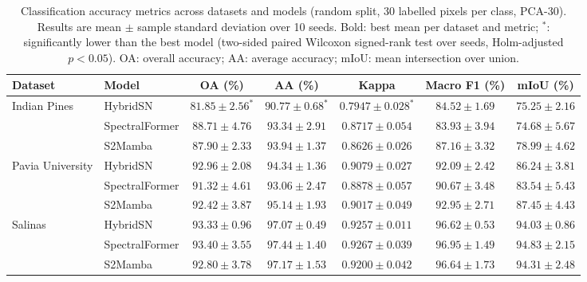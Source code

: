 \begin{table}[!t]
\centering
\caption{Classification accuracy metrics across datasets and models (random split, 30 labelled pixels per class, PCA-30). Results are mean $\pm$ sample standard deviation over 10 seeds. Bold: best mean per dataset and metric; $^{*}$: significantly lower than the best model (two-sided paired Wilcoxon signed-rank test over seeds, Holm-adjusted $p<0.05$). OA: overall accuracy; AA: average accuracy; mIoU: mean intersection over union.}
\label{tab:benchmark_accuracy}
\scriptsize
\setlength{\tabcolsep}{4pt}
\renewcommand{\arraystretch}{1.15}
\begin{tabular}{llccccc}
\toprule
\textbf{Dataset} & \textbf{Model} & \textbf{OA (\%)} & \textbf{AA (\%)} & \textbf{Kappa} & \textbf{Macro F1 (\%)} & \textbf{mIoU (\%)} \\
\midrule
\multirow{3}{*}{Indian Pines} & HybridSN & $81.85 \pm 2.56^{*}$ & $90.77 \pm 0.68^{*}$ & $0.7947 \pm 0.028^{*}$ & $84.52 \pm 1.69$ & $75.25 \pm 2.16$ \\
 & SpectralFormer & $\mathbf{88.71 \pm 4.76}$ & $93.34 \pm 2.91$ & $\mathbf{0.8717 \pm 0.054}$ & $83.93 \pm 3.94$ & $74.68 \pm 5.67$ \\
 & S2Mamba & $87.90 \pm 2.33$ & $\mathbf{93.94 \pm 1.37}$ & $0.8626 \pm 0.026$ & $\mathbf{87.16 \pm 3.32}$ & $\mathbf{78.99 \pm 4.62}$ \\
\midrule
\multirow{3}{*}{Pavia University} & HybridSN & $\mathbf{92.96 \pm 2.08}$ & $94.34 \pm 1.36$ & $\mathbf{0.9079 \pm 0.027}$ & $92.09 \pm 2.42$ & $86.24 \pm 3.81$ \\
 & SpectralFormer & $91.32 \pm 4.61$ & $93.06 \pm 2.47$ & $0.8878 \pm 0.057$ & $90.67 \pm 3.48$ & $83.54 \pm 5.43$ \\
 & S2Mamba & $92.42 \pm 3.87$ & $\mathbf{95.14 \pm 1.93}$ & $0.9017 \pm 0.049$ & $\mathbf{92.95 \pm 2.71}$ & $\mathbf{87.45 \pm 4.43}$ \\
\midrule
\multirow{3}{*}{Salinas} & HybridSN & $93.33 \pm 0.96$ & $97.07 \pm 0.49$ & $0.9257 \pm 0.011$ & $96.62 \pm 0.53$ & $94.03 \pm 0.86$ \\
 & SpectralFormer & $\mathbf{93.40 \pm 3.55}$ & $\mathbf{97.44 \pm 1.40}$ & $\mathbf{0.9267 \pm 0.039}$ & $\mathbf{96.95 \pm 1.49}$ & $\mathbf{94.83 \pm 2.15}$ \\
 & S2Mamba & $92.80 \pm 3.78$ & $97.17 \pm 1.53$ & $0.9200 \pm 0.042$ & $96.64 \pm 1.73$ & $94.31 \pm 2.48$ \\
\bottomrule
\end{tabular}
\end{table}
